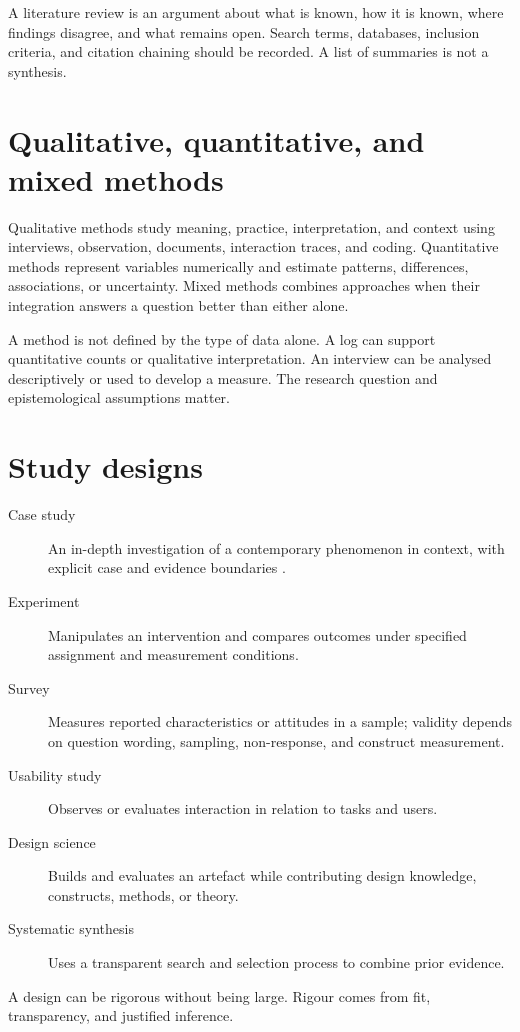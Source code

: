 A literature review is an argument about what is known, how it is known, where findings disagree, and what remains open. Search terms, databases, inclusion criteria, and citation chaining should be recorded. A list of summaries is not a synthesis.

\section{Qualitative, quantitative, and mixed methods}
Qualitative methods study meaning, practice, interpretation, and context using interviews, observation, documents, interaction traces, and coding. Quantitative methods represent variables numerically and estimate patterns, differences, associations, or uncertainty. Mixed methods combines approaches when their integration answers a question better than either alone.

A method is not defined by the type of data alone. A log can support quantitative counts or qualitative interpretation. An interview can be analysed descriptively or used to develop a measure. The research question and epistemological assumptions matter.

\section{Study designs}
\begin{description}
\item[Case study] An in-depth investigation of a contemporary phenomenon in context, with explicit case and evidence boundaries \citep{runeson2009case}.
\item[Experiment] Manipulates an intervention and compares outcomes under specified assignment and measurement conditions.
\item[Survey] Measures reported characteristics or attitudes in a sample; validity depends on question wording, sampling, non-response, and construct measurement.
\item[Usability study] Observes or evaluates interaction in relation to tasks and users.
\item[Design science] Builds and evaluates an artefact while contributing design knowledge, constructs, methods, or theory.
\item[Systematic synthesis] Uses a transparent search and selection process to combine prior evidence.
\end{description}

A design can be rigorous without being large. Rigour comes from fit, transparency, and justified inference.

